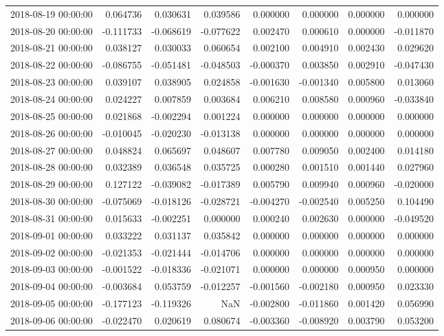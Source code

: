 \begin{tabular}{lrrrrrrr}
2018-08-19 00:00:00 & 0.064736 & 0.030631 & 0.039586 & 0.000000 & 0.000000 & 0.000000 & 0.000000 \\
2018-08-20 00:00:00 & -0.111733 & -0.068619 & -0.077622 & 0.002470 & 0.000610 & 0.000000 & -0.011870 \\
2018-08-21 00:00:00 & 0.038127 & 0.030033 & 0.060654 & 0.002100 & 0.004910 & 0.002430 & 0.029620 \\
2018-08-22 00:00:00 & -0.086755 & -0.051481 & -0.048503 & -0.000370 & 0.003850 & 0.002910 & -0.047430 \\
2018-08-23 00:00:00 & 0.039107 & 0.038905 & 0.024858 & -0.001630 & -0.001340 & 0.005800 & 0.013060 \\
2018-08-24 00:00:00 & 0.024227 & 0.007859 & 0.003684 & 0.006210 & 0.008580 & 0.000960 & -0.033840 \\
2018-08-25 00:00:00 & 0.021868 & -0.002294 & 0.001224 & 0.000000 & 0.000000 & 0.000000 & 0.000000 \\
2018-08-26 00:00:00 & -0.010045 & -0.020230 & -0.013138 & 0.000000 & 0.000000 & 0.000000 & 0.000000 \\
2018-08-27 00:00:00 & 0.048824 & 0.065697 & 0.048607 & 0.007780 & 0.009050 & 0.002400 & 0.014180 \\
2018-08-28 00:00:00 & 0.032389 & 0.036548 & 0.035725 & 0.000280 & 0.001510 & 0.001440 & 0.027960 \\
2018-08-29 00:00:00 & 0.127122 & -0.039082 & -0.017389 & 0.005790 & 0.009940 & 0.000960 & -0.020000 \\
2018-08-30 00:00:00 & -0.075069 & -0.018126 & -0.028721 & -0.004270 & -0.002540 & 0.005250 & 0.104490 \\
2018-08-31 00:00:00 & 0.015633 & -0.002251 & 0.000000 & 0.000240 & 0.002630 & 0.000000 & -0.049520 \\
2018-09-01 00:00:00 & 0.033222 & 0.031137 & 0.035842 & 0.000000 & 0.000000 & 0.000000 & 0.000000 \\
2018-09-02 00:00:00 & -0.021353 & -0.021444 & -0.014706 & 0.000000 & 0.000000 & 0.000000 & 0.000000 \\
2018-09-03 00:00:00 & -0.001522 & -0.018336 & -0.021071 & 0.000000 & 0.000000 & 0.000950 & 0.000000 \\
2018-09-04 00:00:00 & -0.003684 & 0.053759 & -0.012257 & -0.001560 & -0.002180 & 0.000950 & 0.023330 \\
2018-09-05 00:00:00 & -0.177123 & -0.119326 & NaN & -0.002800 & -0.011860 & 0.001420 & 0.056990 \\
2018-09-06 00:00:00 & -0.022470 & 0.020619 & 0.080674 & -0.003360 & -0.008920 & 0.003790 & 0.053200 \\

\end{tabular}
